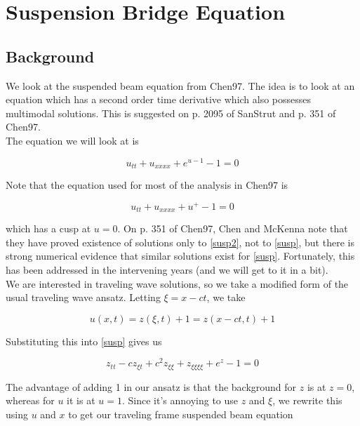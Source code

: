 \documentclass[12pt]{article}
\begin{document}
\section{Suspension Bridge Equation}

\subsection{Background}

We look at the suspended beam equation from Chen97. The idea is to look at an equation which has a second order time derivative which also possesses multimodal solutions. This is suggested on p. 2095 of SanStrut and p. 351 of Chen97.\\

The equation we will look at is

\begin{equation}\label{susp}
u_{tt} + u_{xxxx} + e^{u - 1} - 1 = 0
\end{equation}

Note that the equation used for most of the analysis in Chen97 is 

\begin{equation}\label{susp2}
u_{tt} + u_{xxxx} + u^+ - 1 = 0
\end{equation}

which has a cusp at $u = 0$. On p. 351 of Chen97, Chen and McKenna note that they have proved existence of solutions only to \eqref{susp2}, not to \eqref{susp}, but there is strong numerical evidence that similar solutions exist for \eqref{susp}. Fortunately, this has been addressed in the intervening years (and we will get to it in a bit). \\

We are interested in traveling wave solutions, so we take a modified form of the usual traveling wave ansatz. Letting $\xi = x - ct$, we take

\begin{equation}
u(x, t) = z(\xi, t) + 1 = z(x - ct, t) + 1
\end{equation}

Substituting this into \eqref{susp} gives us

\begin{equation*}
z_{tt} - c z_{\xi t} + c^2 z_{\xi \xi} + z_{\xi \xi \xi \xi} + e^{z} - 1 = 0
\end{equation*}

The advantage of adding 1 in our ansatz is that the background for $z$ is at $z = 0$, whereas for $u$ it is at $u = 1$. Since it's annoying to use $z$ and $\xi$, we rewrite this using $u$ and $x$ to get our traveling frame suspended beam equation
\end{document}
